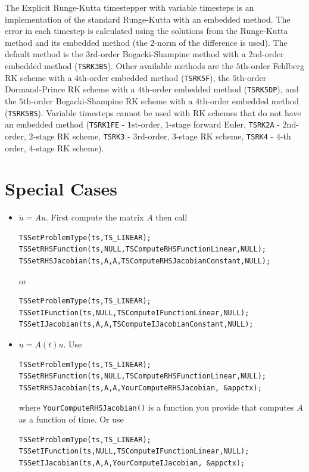 The Explicit Runge-Kutta timestepper with variable timesteps is an 
implementation of the standard Runge-Kutta with an embedded method. The error in each
timestep is calculated using the solutions from the Runge-Kutta method and its embedded
method (the 2-norm of the difference is used). The default method is the 
$3$rd-order Bogacki-Shampine method with a $2$nd-order embedded method (\lstinline{TSRK3BS}).
Other available methods are the  $5$th-order Fehlberg RK scheme with a $4$th-order embedded
method (\lstinline{TSRK5F}), the  $5$th-order Dormand-Prince RK scheme with a $4$th-order embedded method
(\lstinline{TSRK5DP}), and the  $5$th-order Bogacki-Shampine RK scheme with a $4$th-order embedded method
(\lstinline{TSRK5BS}). Variable timesteps cannot be used with RK schemes that do not have an embedded
method (\lstinline{TSRK1FE} - $1$st-order, $1$-stage forward Euler, \lstinline{TSRK2A} - $2$nd-order, $2$-stage RK scheme,
\lstinline{TSRK3} - $3$rd-order, $3$-stage RK scheme, \lstinline{TSRK4} - $4$-th order, $4$-stage RK scheme).

\section{Special Cases}

\begin{itemize}
\item $ \dot{u} = A u.$ First compute the matrix $ A$ then call
\begin{lstlisting}
TSSetProblemType(ts,TS_LINEAR);
TSSetRHSFunction(ts,NULL,TSComputeRHSFunctionLinear,NULL); 
TSSetRHSJacobian(ts,A,A,TSComputeRHSJacobianConstant,NULL);
\end{lstlisting}
or
\begin{lstlisting}
TSSetProblemType(ts,TS_LINEAR);
TSSetIFunction(ts,NULL,TSComputeIFunctionLinear,NULL); 
TSSetIJacobian(ts,A,A,TSComputeIJacobianConstant,NULL);
\end{lstlisting}

\item $ \dot{u} = A(t) u.$ Use
\begin{lstlisting}
TSSetProblemType(ts,TS_LINEAR);
TSSetRHSFunction(ts,NULL,TSComputeRHSFunctionLinear,NULL); 
TSSetRHSJacobian(ts,A,A,YourComputeRHSJacobian, &appctx);
\end{lstlisting}
where {\tt YourComputeRHSJacobian()} is a function you provide that computes $A$ as a function of time. Or use
\begin{lstlisting}
TSSetProblemType(ts,TS_LINEAR);
TSSetIFunction(ts,NULL,TSComputeIFunctionLinear,NULL); 
TSSetIJacobian(ts,A,A,YourComputeIJacobian, &appctx);
\end{lstlisting}

\end{itemize}

